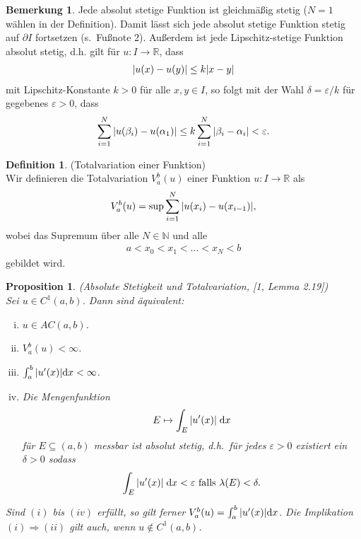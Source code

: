 \documentclass[twoside]{article}
\newtheorem{proposition}[theorem]{Proposition}
\theoremstyle{definition}
\newtheorem{remark}[theorem]{Bemerkung}
\newtheorem{definition}[theorem]{Definition}
\newcommand{\R}{\mathbb{R}}
\newcommand{\N}{\mathbb{N}}
\begin{document}
\begin{remark}
Jede absolut stetige Funktion ist gleichmäßig stetig ($N=1$ wählen in der Definition). Damit lässt sich jede absolut stetige Funktion stetig auf $\partial I$ fortsetzen (s.\ Fußnote 2). Außerdem ist jede Lipschitz-stetige Funktion absolut stetig, d.h. gilt für $u : I \to \R$, dass
\begin{align*}
\abs{u(x) - u(y)} \leq k \abs{x-y}
\end{align*}
mit Lipschitz-Konstante $k > 0$ für alle $x,y \in I$, so folgt mit der Wahl $\delta = \varepsilon/ k$ für gegebenes $\varepsilon > 0$, dass
\begin{align*}
\sum_{i=1}^N \abs{u(\beta_i) - u(\alpha_1)} \leq k \sum_{i=1}^N \abs{\beta_i - \alpha_i} < \varepsilon.
\end{align*}
\end{remark}
\begin{definition} (Totalvariation einer Funktion)\\
Wir definieren die Totalvariation $V^b_a(u)$ einer Funktion $u:I \to \R$ als
\begin{align}
V^b_a(u) = \sup \sum_{i=1}^N \abs{u(x_i)-u(x_{i-1})},
\end{align}
wobei das Supremum über alle $N \in \N$ und alle
\begin{align*}
a < x_0 < x_1 < \dots < x_N < b
\end{align*}
gebildet wird.
\end{definition}
\begin{proposition} (Absolute Stetigkeit und Totalvariation, [1, Lemma 2.19]) \label{prop:ac} \\
Sei $u \in C^1(a,b)$. Dann sind äquivalent:
\begin{enumerate}[(i)]
\item $u \in AC(a,b)$.
\item $V^b_a(u) < \infty$.
\item $\int_a^b \abs{u'(x)} \dd x < \infty$.
\item Die Mengenfunktion
\begin{align*}
E \mapsto \int_E \abs{u'(x)} \; \dd x
\end{align*}
für $E \subseteq (a,b)$ messbar ist absolut stetig, d.h.\ für jedes $\varepsilon  > 0$ existiert ein $\delta > 0$ sodass
\begin{align*}
\int_E \abs{u'(x)} \; \dd x < \varepsilon \text{ falls } \lambda(E) < \delta.
\end{align*}
\end{enumerate}
Sind $(i)$ bis $(iv)$ erfüllt, so gilt ferner $V^b_a(u) = \int_a^b \abs{u'(x)} \dd x$. Die Implikation $(i) \Rightarrow (ii)$ gilt auch, wenn $u \not \in C^1(a,b)$.
\end{proposition}
\end{document}
